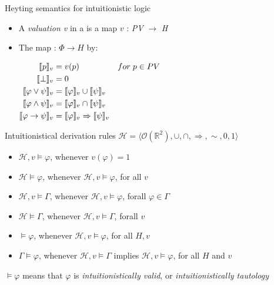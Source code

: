 \documentclass[sans]{beamer}
\begin{document}
\begin{frame}{Heyting semantics for intuitionistic logic}
  \begin{itemize}
    \item A \emph{valuation v} in a  is a map $v$ : \emph{PV} $\to$ \emph{H}
    \item The map \vmsem{\bullet} : $\Phi \to H$ by:

      $\begin{aligned}
        \llbracket p \rrbracket_v &= v(p) & for \; p \in PV \\
        \llbracket \bot \rrbracket_v &= 0 \\
        \llbracket \varphi \vee \psi \rrbracket_v &= \llbracket \varphi \rrbracket_v \cup \llbracket \psi \rrbracket_v \\
        \llbracket \varphi \wedge \psi \rrbracket_v &= \llbracket \varphi \rrbracket_v \cap \llbracket \psi \rrbracket_v\\
        \llbracket \varphi \to \psi \rrbracket_v &= \llbracket \varphi \rrbracket_v \Rightarrow \llbracket \psi \rrbracket_v
       \end{aligned}$
  \end{itemize}
\end{frame}


\newcommand{\calh}{\cali{H}}
\newcommand{\mcalh}{\mathcal{H}}

\begin{frame}{Intuitionistical derivation rules}
  $\mathcal{H} = \langle \mathcal{O}(\mathbb{R}^2), \cup, \cap, \Rightarrow, {\sim}, 0, 1 \rangle$
  \begin{itemize}
    \item $\mcalh, v \models \varphi$, whenever $v(\varphi) = 1$
    \item $\mcalh \models \varphi$, whenever $\mcalh, v \models \varphi$, for all $v$
    \item $\mcalh, v \models \Gamma$, whenever $\mcalh, v \models \varphi$, forall $\varphi \in \Gamma$
    \item $\mcalh \models \Gamma$, whenever $\mcalh, v \models \Gamma$, forall $v$
    \item $\models \varphi$, whenever $\mcalh, v \models \varphi$, for all $H, v$
    \item $\Gamma \models \varphi$, whenever $\mcalh, v \models \Gamma$ implies $\mcalh, v \models \varphi$, for all $H$ and $v$
  \end{itemize}

  \vfill
  $\models \varphi$ means that $\varphi$ is \emph{intuitionistically valid}, or \emph{intuitionistically tautology}

\end{frame}
\end{document}
